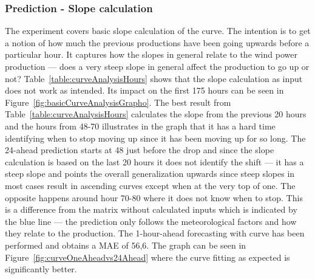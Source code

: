 \subsubsection{Prediction - Slope calculation}
\label{sec:windPowerSlopeCalc}
The experiment covers basic slope calculation of the curve. The intention is to get a notion of how much the previous productions have been going upwards before a particular hour. It captures how the slopes in general relate to the wind power production --- does a very steep slope in general affect the production to go up or not? Table~\ref{table:curveAnalysisHours} shows that the slope calculation as input does not work as intended. Its impact on the first 175 hours can be seen in Figure~\ref{fig:basicCurveAnalysisGrapho}. The best result from Table~\ref{table:curveAnalysisHours} calculates the slope from the previous 20 hours and the hours from 48-70 illustrates in the graph that it has a hard time identifying when to stop moving up since it has been moving up for so long. The 24-ahead prediction starts at 48 just before the drop and since the slope calculation is based on the last 20 hours it does not identify the shift --- it has a steep slope and points the overall generalization upwards since steep slopes in most cases result in ascending curves except when at the very top of one. The opposite happens around hour 70-80 where it does not know when to stop. This is a difference from the matrix without calculated inputs which is indicated by the blue line --- the prediction only follows the meteorological factors and how they relate to the production. The 1-hour-ahead forecasting with curve has been performed and obtains a MAE of 56,6. The graph can be seen in Figure~\ref{fig:curveOneAheadvs24Ahead} where the curve fitting as expected is significantly better.

